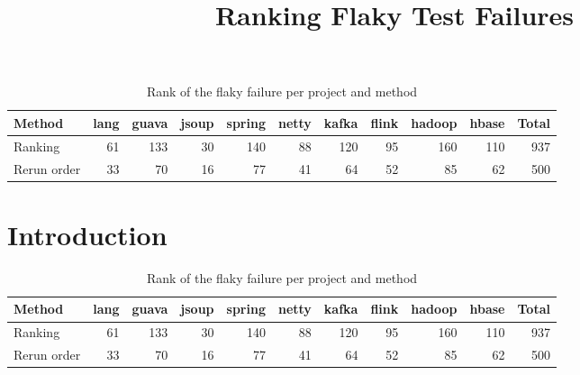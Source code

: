\documentclass[10pt,conference,letterpaper]{IEEEtran}
\makeatletter
\newcommand{\ranktable}[1]{%
\begin{table}[t]
\caption{Rank of the flaky failure per project and method}
\centering
\begin{tabular*}{\dimexpr\textwidth+#1\relax}{@{\extracolsep{\fill}}lrrrrrrrrrr@{}}
\toprule
Method & lang & guava & jsoup & spring & netty & kafka & flink & hadoop & hbase & Total \\
\midrule
Ranking & 61 & 133 & 30 & 140 & 88 & 120 & 95 & 160 & 110 & 937 \\
Rerun order & 33 & 70 & 16 & 77 & 41 & 64 & 52 & 85 & 62 & 500 \\
\bottomrule
\end{tabular*}
\end{table}}
\makeatother
\begin{document}
\title{Ranking Flaky Test Failures}
\author{}
\maketitle
\ranktable{40pt}
\section{Introduction}
\lipsum[1-9]
\ranktable{6pt}
\lipsum[10-24]
\end{document}
